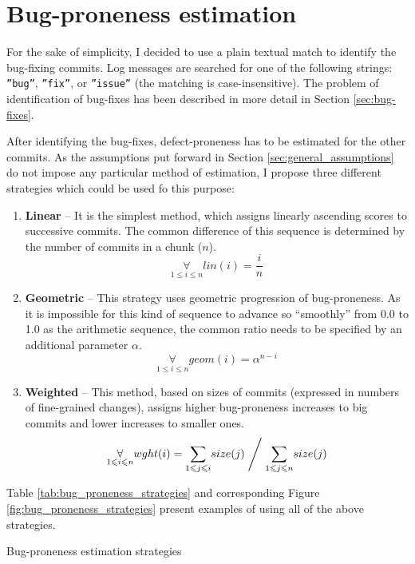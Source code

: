 \documentclass{pracamgr}
\begin{document}

\section{Bug-proneness estimation}
\label{sec:bug-proneness}
For the sake of simplicity, I decided to use a plain textual match to identify the bug-fixing commits. Log messages are searched for one of the following strings: \texttt{''bug''}, \texttt{''fix''}, or \texttt{''issue''} (the matching is case-insensitive). The problem of identification of bug-fixes has been described in more detail in Section \ref{sec:bug-fixes}.

After identifying the bug-fixes, defect-proneness has to be estimated for the other commits. As the assumptions put forward in Section \ref{sec:general_assumptions} do not impose any particular method of estimation, I propose three different strategies which could be used fo this purpose:
\begin{enumerate}[label=(S\arabic*)]
	\item \textbf{Linear} -- It is the simplest method, which assigns linearly ascending scores to successive commits. The common difference of this sequence is determined by the number of commits in a chunk ($n$).
	\[ \underset{1 \leqslant i \leqslant n}{\forall} lin(i) = \frac{i}{n} \]
	\item \textbf{Geometric} -- This strategy uses geometric progression of bug-proneness. As it is impossible for this kind of sequence to advance so ``smoothly'' from 0.0 to 1.0 as the arithmetic sequence, the common ratio needs to be specified by an additional parameter $\alpha$.
	\[ \underset{1 \leqslant i \leqslant n}{\forall} geom(i) = \alpha^{n - i} \]
	\item \textbf{Weighted} -- This method, based on sizes of commits (expressed in numbers of fine-grained changes), assigns higher bug-proneness increases to big commits and lower increases to smaller ones.
	\[ \underset{1 \leqslant i \leqslant n}{\forall} wght(i) =  \underset{1 \leqslant j \leqslant i}{\sum} size(j) \Biggm/ \underset{1 \leqslant j \leqslant n}{\sum} size(j) 	 \]
\end{enumerate}

Table \ref{tab:bug_proneness_strategies} and corresponding Figure \ref{fig:bug_proneness_strategies} present examples of using all of the above strategies.

\begin{table}[H]
\centering
\caption{Bug-proneness estimation strategies} 
\label{tab:bug_proneness_strategies}

\end{table}
\end{document}

